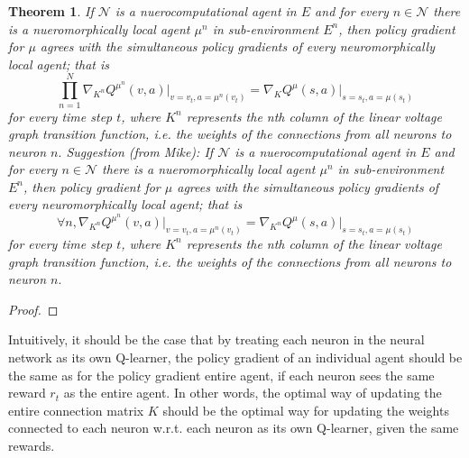 \documentclass{article} %
\newtheorem{theorem}{Theorem}
\numberwithin{equation}{subsection}
\numberwithin{theorem}{subsection}
\def\scriptn{{\mathcal N}}
\begin{document}
\begin{theorem}
    If $\scriptn$ is a nuerocomputational agent in $E$ and for every $n \in \scriptn$ there is a nueromorphically local agent $\mu^n$ in sub-environment $E^n$, then policy gradient for $\mu$ agrees with the simultaneous policy gradients of every neuromorphically local agent; that is
    \begin{equation}
        \prod_{n=1}^N \nabla_{K^n} Q^{\mu^n}(v,a)\Big|_{v=v_t,a=\mu^n(v_t)} =\nabla_{K} Q^{\mu}(s,a)\Big|_{s=s_t,a=\mu(s_t)}
    \end{equation}
    for every time step $t$, where $K^n$ represents the nth column of the linear voltage graph transition function, i.e. the weights of the connections from all neurons to neuron $n.$
    \newline \newline Suggestion (from Mike): \newline \newline
    If $\scriptn$ is a nuerocomputational agent in $E$ and for every $n \in \scriptn$ there is a nueromorphically local agent $\mu^n$ in sub-environment $E^n$, then policy gradient for $\mu$ agrees with the simultaneous policy gradients of every neuromorphically local agent; that is
    \begin{equation}
        \forall n, \nabla_{K^n} Q^{\mu^n}(v,a)\Big|_{v=v_t,a=\mu^n(v_t)} =\nabla_{K^n} Q^{\mu}(s,a)\Big|_{s=s_t,a=\mu(s_t)}
    \end{equation}
    for every time step $t$, where $K^n$ represents the nth column of the linear voltage graph transition function, i.e. the weights of the connections from all neurons to neuron $n.$
\end{theorem}
\begin{proof}
\end{proof}




Intuitively, it should be the case that by treating each neuron in the neural network as its own Q-learner, the policy gradient of an individual agent should be the same as for the policy gradient entire agent, if each neuron sees the same reward $r_t$ as the entire agent. In other words, the optimal way of updating the entire connection matrix $K$ should be the optimal way for updating the weights connected to each neuron w.r.t. each neuron as its own Q-learner, given the same rewards.
\end{document}
